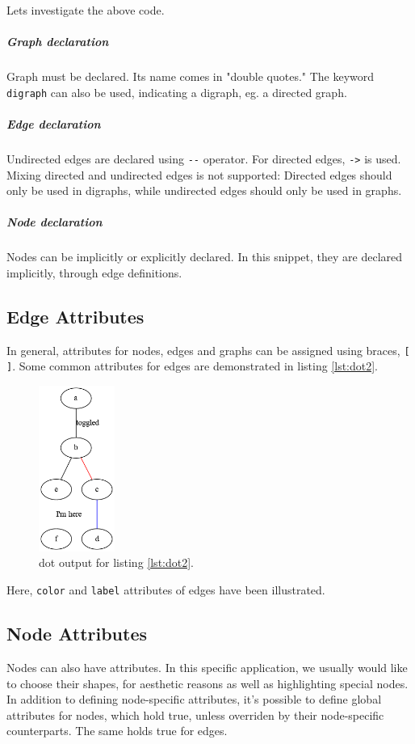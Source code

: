 \documentclass{article}
\begin{document}
	Lets investigate the above code.
	
	\subparagraph{Graph declaration}
		Graph must be declared. Its name comes in "double quotes." The keyword \lstinline{digraph} can also be used, indicating a digraph, eg. a directed graph.
	
	\subparagraph{Edge declaration}
		Undirected edges are declared using \lstinline{--} operator. For directed edges, \lstinline{->} is used. Mixing directed and undirected edges is not supported: Directed edges should only be used in digraphs, while undirected edges should only be used in graphs.

	\subparagraph{Node declaration}
		Nodes can be implicitly or explicitly declared. In this snippet, they are declared implicitly, through edge definitions.
	
	\subsection{Edge Attributes}
	In general, attributes for nodes, edges and graphs can be assigned using braces, \lstinline{[ ]}. Some common attributes for edges are demonstrated in listing \ref{lst:dot2}.

	

	\begin{figure}[H]
		\begin{center}
			\includegraphics[width=25mm]{figure2.png}
		\end{center}
		\caption{dot output for listing \ref{lst:dot2}.}
		\label{fig:png2}
	\end{figure}

	Here, \lstinline{color} and \lstinline{label} attributes of edges have been illustrated. 

	\subsection{Node Attributes}
	Nodes can also have attributes. In this specific application, we usually would like to choose their shapes, for aesthetic reasons as well as highlighting special nodes. In addition to defining node-specific attributes, it's possible to define global attributes for nodes, which hold true, unless overriden by their node-specific counterparts. The same holds true for edges.
\end{document}
